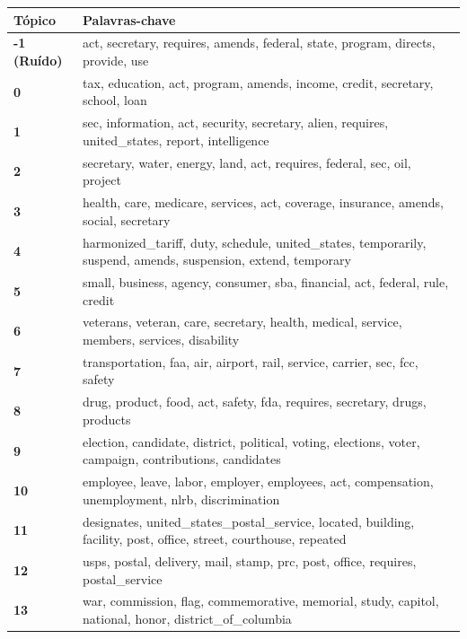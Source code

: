\begin{table}[htpb]
    \centering
    \scriptsize
    \begin{tabularx}{\textwidth}{@{}l X@{}}
        \toprule
        \textbf{Tópico} & \textbf{Palavras-chave} \\
        \midrule
        \textbf{-1 (Ruído)} & act, secretary, requires, amends, federal, state, program, directs, provide, use \\
        \textbf{0} & tax, education, act, program, amends, income, credit, secretary, school, loan \\
        \textbf{1} & sec, information, act, security, secretary, alien, requires, united\_states, report, intelligence \\
        \textbf{2} & secretary, water, energy, land, act, requires, federal, sec, oil, project \\
        \textbf{3} & health, care, medicare, services, act, coverage, insurance, amends, social, secretary \\
        \textbf{4} & harmonized\_tariff, duty, schedule, united\_states, temporarily, suspend, amends, suspension, extend, temporary \\
        \textbf{5} & small, business, agency, consumer, sba, financial, act, federal, rule, credit \\
        \textbf{6} & veterans, veteran, care, secretary, health, medical, service, members, services, disability \\
        \textbf{7} & transportation, faa, air, airport, rail, service, carrier, sec, fcc, safety \\
        \textbf{8} & drug, product, food, act, safety, fda, requires, secretary, drugs, products \\
        \textbf{9} & election, candidate, district, political, voting, elections, voter, campaign, contributions, candidates \\
        \textbf{10} & employee, leave, labor, employer, employees, act, compensation, unemployment, nlrb, discrimination \\
        \textbf{11} & designates, united\_states\_postal\_service, located, building, facility, post, office, street, courthouse, repeated \\
        \textbf{12} & usps, postal, delivery, mail, stamp, prc, post, office, requires, postal\_service \\
        \textbf{13} & war, commission, flag, commemorative, memorial, study, capitol, national, honor, district\_of\_columbia \\

\end{tabularx}
\end{table}
